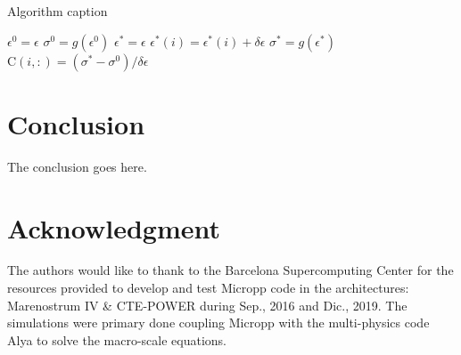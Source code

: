 \documentclass[conference, onecolumn]{IEEEtran}
\begin{document}
\begin{algorithm}
\caption{Algorithm caption}
\label{alg:algorithm-label}
\begin{algorithmic}
 \STATE $ \epsilon^{0} = \epsilon $
 \STATE $ \sigma^{0} = g(\epsilon^{0})$
     \STATE $ \epsilon^{*} = \epsilon $
     \STATE $ \epsilon^{*}(i) = \epsilon^{*}(i) + \delta\epsilon $
     \STATE $ \sigma^{*} = g(\epsilon^{*})$
     \STATE $ \mathrm{C} (i, :) = ( \sigma^* - \sigma^0 ) / \delta\epsilon $
 \ENDFOR
\end{algorithmic}
\end{algorithm}






\section{Conclusion}
The conclusion goes here.

\section*{Acknowledgment}

The authors would like to thank to the Barcelona Supercomputing Center for the resources provided to develop and test Micropp code in the architectures: Marenostrum IV \& CTE-POWER during Sep., 2016 and Dic., 2019. The simulations were primary done coupling Micropp with the multi-physics code Alya to solve the macro-scale equations.

\begin{thebibliography}{1}




\end{thebibliography}
\end{document}
